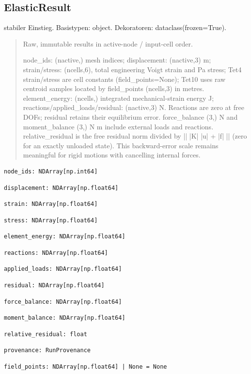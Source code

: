 \subsection{ElasticResult}
stabiler Einstieg.
Basistypen: object. Dekoratoren: dataclass(frozen=True).
\begin{quote}
Raw, immutable results in active-node / input-cell order.\par node\_ids: (nactive,) mesh indices; displacement: (nactive,3) m; strain/stress: (ncells,6), total engineering Voigt strain and Pa stress; Tet4 strain/stress are cell constants (field\_points=None); Tet10 uses raw centroid samples located by field\_points (ncells,3) in metres. element\_energy: (ncells,) integrated mechanical-strain energy J; reactions/applied\_loads/residual: (nactive,3) N. Reactions are zero at free DOFs; residual retains their equilibrium error. force\_balance (3,) N and moment\_balance (3,) N m include external loads and reactions. relative\_residual is the free residual norm divided by || |K| |u| + |f| || (zero for an exactly unloaded state). This backward-error scale remains meaningful for rigid motions with cancelling internal forces.
\end{quote}
\begin{lstlisting}
node_ids: NDArray[np.int64]
\end{lstlisting}
\begin{lstlisting}
displacement: NDArray[np.float64]
\end{lstlisting}
\begin{lstlisting}
strain: NDArray[np.float64]
\end{lstlisting}
\begin{lstlisting}
stress: NDArray[np.float64]
\end{lstlisting}
\begin{lstlisting}
element_energy: NDArray[np.float64]
\end{lstlisting}
\begin{lstlisting}
reactions: NDArray[np.float64]
\end{lstlisting}
\begin{lstlisting}
applied_loads: NDArray[np.float64]
\end{lstlisting}
\begin{lstlisting}
residual: NDArray[np.float64]
\end{lstlisting}
\begin{lstlisting}
force_balance: NDArray[np.float64]
\end{lstlisting}
\begin{lstlisting}
moment_balance: NDArray[np.float64]
\end{lstlisting}
\begin{lstlisting}
relative_residual: float
\end{lstlisting}
\begin{lstlisting}
provenance: RunProvenance
\end{lstlisting}
\begin{lstlisting}
field_points: NDArray[np.float64] | None = None
\end{lstlisting}
